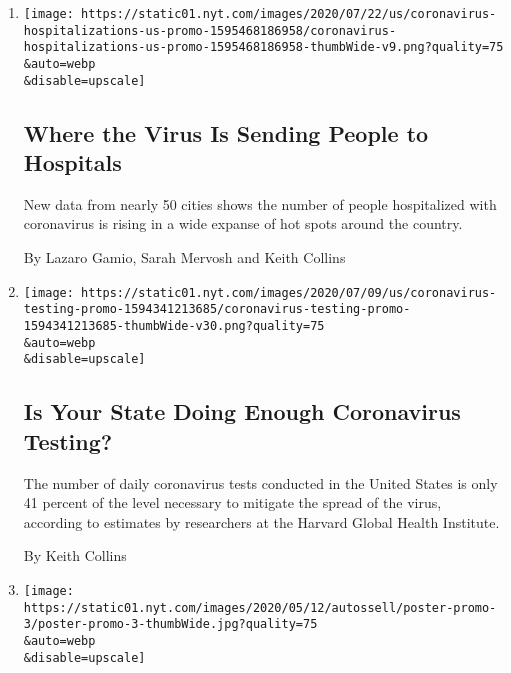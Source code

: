 \begin{enumerate}
\def\labelenumi{\arabic{enumi}.}
\item
  \href{/interactive/2020/07/23/us/coronavirus-hospitalizations-us.html}{}

  \texttt{[image: https://static01.nyt.com/images/2020/07/22/us/coronavirus-hospitalizations-us-promo-1595468186958/coronavirus-hospitalizations-us-promo-1595468186958-thumbWide-v9.png?quality=75\\\&auto=webp\\\&disable=upscale]}

  \hypertarget{where-the-virus-is-sending-people-to-hospitals}{%
  \subsection{Where the Virus Is Sending People to
  Hospitals}\label{where-the-virus-is-sending-people-to-hospitals}}

  New data from nearly 50 cities shows the number of people hospitalized
  with coronavirus is rising in a wide expanse of hot spots around the
  country.

  By Lazaro Gamio, Sarah Mervosh and Keith Collins
\item
  \href{/interactive/2020/us/coronavirus-testing.html}{}

  \texttt{[image: https://static01.nyt.com/images/2020/07/09/us/coronavirus-testing-promo-1594341213685/coronavirus-testing-promo-1594341213685-thumbWide-v30.png?quality=75\\\&auto=webp\\\&disable=upscale]}

  \hypertarget{is-your-state-doing-enough-coronavirus-testing}{%
  \subsection{Is Your State Doing Enough Coronavirus
  Testing?}\label{is-your-state-doing-enough-coronavirus-testing}}

  The number of daily coronavirus tests conducted in the United States
  is only 41 percent of the level necessary to mitigate the spread of
  the virus, according to estimates by researchers at the Harvard Global
  Health Institute.

  By Keith Collins
\item
  \href{/interactive/2020/05/12/us/coronavirus-testing-white-house.html}{}

  \texttt{[image: https://static01.nyt.com/images/2020/05/12/autossell/poster-promo-3/poster-promo-3-thumbWide.jpg?quality=75\\\&auto=webp\\\&disable=upscale]}

  \hypertarget{the-white-house-uses-this-device-for-virus-testing-some-results-might-be-false}{%
}
\end{enumerate}
